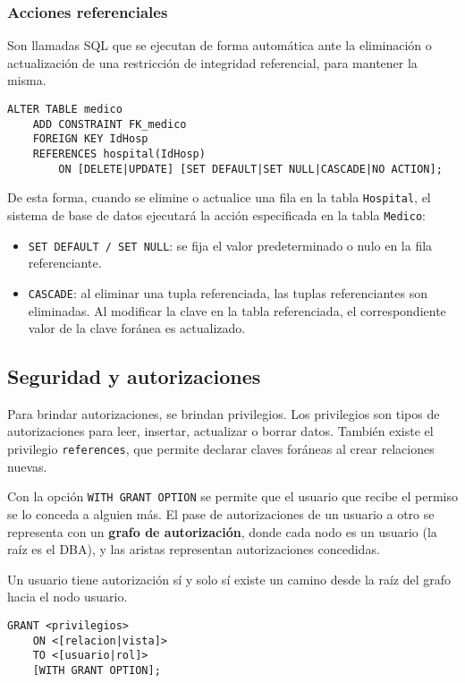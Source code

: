 \documentclass[a4paper, twoside]{article}
\begin{document}
\subsubsection{Acciones referenciales}

Son llamadas SQL que se ejecutan de forma automática ante la eliminación
o actualización de una restricción de integridad referencial, para
mantener la misma.

\begin{lstlisting}
ALTER TABLE medico 
	ADD CONSTRAINT FK_medico 
	FOREIGN KEY IdHosp 
	REFERENCES hospital(IdHosp)
		ON [DELETE|UPDATE] [SET DEFAULT|SET NULL|CASCADE|NO ACTION];
\end{lstlisting}


De esta forma, cuando se elimine o actualice una fila en la tabla
\texttt{Hospital}, el sistema de base de datos ejecutará la acción
especificada en la tabla \texttt{Medico}:
\begin{itemize}
\item \texttt{SET DEFAULT / SET NULL}: se fija el valor predeterminado o
nulo en la fila referenciante.
\item \texttt{CASCADE}: al eliminar una tupla referenciada, las tuplas referenciantes
son eliminadas. Al modificar la clave en la tabla referenciada, el
correspondiente valor de la clave foránea es actualizado.
\end{itemize}

\subsection{Seguridad y autorizaciones}

Para brindar autorizaciones, se brindan privilegios. Los privilegios
son tipos de autorizaciones para leer, insertar, actualizar o borrar
datos. También existe el privilegio \texttt{references}, que permite
declarar claves foráneas al crear relaciones nuevas.

Con la opción \texttt{WITH GRANT OPTION} se permite que el usuario
que recibe el permiso se lo conceda a alguien más. El pase de autorizaciones
de un usuario a otro se representa con un \textbf{grafo de autorización},
donde cada nodo es un usuario (la raíz es el DBA), y las aristas representan
autorizaciones concedidas.

Un usuario tiene autorización sí y solo sí existe un camino desde
la raíz del grafo hacia el nodo usuario.

\begin{lstlisting}
GRANT <privilegios>
	ON <[relacion|vista]>
	TO <[usuario|rol]>
	[WITH GRANT OPTION];
\end{lstlisting}
\end{document}
